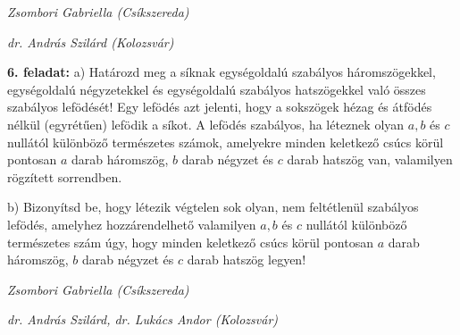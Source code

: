 \documentclass[a4paper,10pt]{article}
\newcommand{\ki}[2]{\hfill {\it #1 (#2)}\medskip}
\begin{document}
\ki{Zsombori Gabriella}{Csíkszereda}

\ki{dr. András Szilárd}{Kolozsvár}\medskip

{\bf 6. feladat: } a) Határozd meg a síknak egy\-ségoldalú szabályos
háromszögekkel, egy\-ség\-oldalú négyzetekkel és
egységoldalú sza\-bályos hatszögekkel való összes
szabályos le\-fö\-dé\-sét! Egy lefödés azt jelenti, hogy
a sokszögek hézag és átfödés nélkül (egyrétűen)
lefödik a síkot. A lefödés szabályos, ha léteznek olyan
$a,b$ és $c$ nullától különböző természetes
számok, amelyekre minden keletkező csúcs körül pontosan
$a$ darab háromszög, $b$ darab négyzet és $c$ darab
hatszög van, valamilyen rögzített sorrendben.

b) Bizonyítsd be, hogy létezik végtelen sok olyan, nem
fel\-tétle\-nül szabályos lefödés, a\-mely\-hez
hozzárendelhető valamilyen $a,b$ és $c$ nullától
különböző természetes szám úgy, hogy minden
keletkező csúcs körül pontosan $a$ darab háromszög, $b$
darab négyzet és $c$ darab hatszög legyen!

\ki{Zsombori Gabriella}{Csíkszereda}

\ki{dr. András Szilárd, dr. Lukács Andor}{Kolozsvár}\medskip
\end{document}
